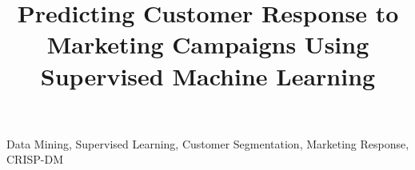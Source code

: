 \documentclass[conference]{IEEEtran}
\begin{document}
\title{Predicting Customer Response to Marketing Campaigns Using Supervised Machine Learning\\
}

\author{
}

\maketitle



\begin{IEEEkeywords}
Data Mining, Supervised Learning, Customer Segmentation, Marketing Response, CRISP-DM
\end{IEEEkeywords}











\end{document}
